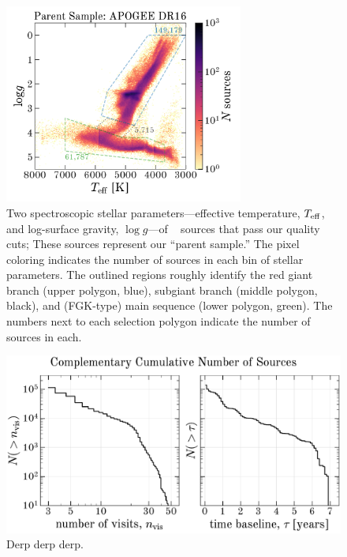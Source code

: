 \documentclass[modern]{aastex62}
\begin{document}
\begin{figure}[th]
\begin{center}
\includegraphics[width=0.7\textwidth]{specHR.pdf}
\end{center}
\caption{%
Two spectroscopic stellar parameters---effective temperature, $T_{\rm eff}$, and
log-surface gravity, $\log g$---of \apogee\  sources that pass our
quality cuts; These sources represent our ``parent sample.''
The pixel coloring indicates the number of sources in each bin of stellar
parameters.
The outlined regions roughly identify the red giant branch (upper polygon,
blue), subgiant branch (middle polygon, black), and (FGK-type) main sequence
(lower polygon, green).
The numbers next to each selection polygon indicate the number of sources in
each.
\label{fig:specHR}
}
\end{figure}

\begin{figure}[th]
\begin{center}
\includegraphics[width=1\textwidth]{visitstats.pdf}
\end{center}
\caption{%
Derp derp derp.
\label{fig:visitstats}
}
\end{figure}
\end{document}
